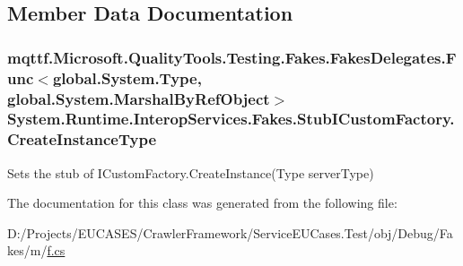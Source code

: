 \subsection{Member Data Documentation}
\hypertarget{class_system_1_1_runtime_1_1_interop_services_1_1_fakes_1_1_stub_i_custom_factory_a747cef3902d07d835cd79561fb886feb}{
\subsubsection[{Create\-Instance\-Type}]{\setlength{\rightskip}{0pt plus 5cm}mqttf.\-Microsoft.\-Quality\-Tools.\-Testing.\-Fakes.\-Fakes\-Delegates.\-Func$<$global.\-System.\-Type, global.\-System.\-Marshal\-By\-Ref\-Object$>$ System.\-Runtime.\-Interop\-Services.\-Fakes.\-Stub\-I\-Custom\-Factory.\-Create\-Instance\-Type}}\label{class_system_1_1_runtime_1_1_interop_services_1_1_fakes_1_1_stub_i_custom_factory_a747cef3902d07d835cd79561fb886feb}


Sets the stub of I\-Custom\-Factory.\-Create\-Instance(\-Type server\-Type)



The documentation for this class was generated from the following file\-:\begin{DoxyCompactItemize}
\item 
D\-:/\-Projects/\-E\-U\-C\-A\-S\-E\-S/\-Crawler\-Framework/\-Service\-E\-U\-Cases.\-Test/obj/\-Debug/\-Fakes/m/\hyperlink{m_2f_8cs}{f.\-cs}\end{DoxyCompactItemize}
